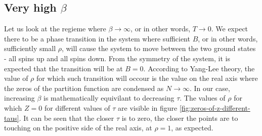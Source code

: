 \documentclass{article}
\begin{document}
\subsection{Very high $\beta$}
Let us look at the regieme where $\beta \rightarrow \infty$, or in other words, $T \rightarrow 0$. We expect there to be a phase transition in the system where sufficient $B$, or in other words, sufficiently small $\rho$, will cause the system to move between the two ground states - all spins up and all spins down. From the symmetry of the system, it is expected that the transition will be at $B = 0$.
\newline
According to Yang-Lee theory, the value of $\rho$ for which such transition will occour is the value on the real axis where the zeros of the partition function are condensed as $N \rightarrow \infty$. In our case, increasing $\beta$ is mathematically equivilant to decreasing $\tau$. The values of $\rho$ for which $Z=0$ for different values of $\tau$ are visible in figure \ref{fig:zeros-of-z-different-taus}. It can be seen that the closer $\tau$ is to zero, the closer the points are to touching on the positive side of the real axis, at $\rho = 1$, as expected.
\end{document}
